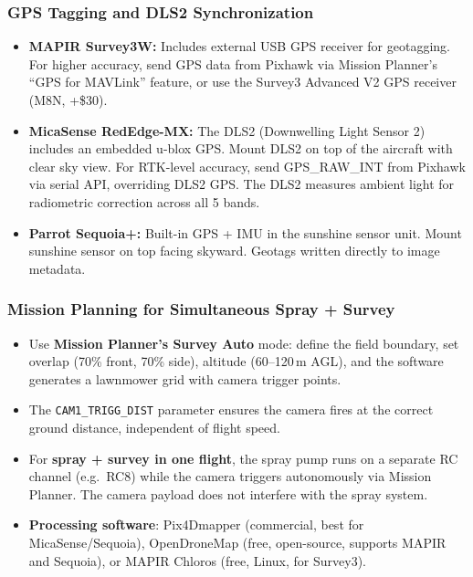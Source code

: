 \documentclass[11pt,a4paper]{article}
\begin{document}
\subsubsection{GPS Tagging and DLS2 Synchronization}

\begin{itemize}
\item \textbf{MAPIR Survey3W:} Includes external USB GPS receiver for geotagging. For higher accuracy, send GPS data from Pixhawk via Mission Planner's ``GPS for MAVLink'' feature, or use the Survey3 Advanced V2 GPS receiver (M8N, +\$30).
\item \textbf{MicaSense RedEdge-MX:} The DLS2 (Downwelling Light Sensor 2) includes an embedded u-blox GPS. Mount DLS2 on top of the aircraft with clear sky view. For RTK-level accuracy, send GPS\_RAW\_INT from Pixhawk via serial API, overriding DLS2 GPS. The DLS2 measures ambient light for radiometric correction across all 5 bands.
\item \textbf{Parrot Sequoia+:} Built-in GPS + IMU in the sunshine sensor unit. Mount sunshine sensor on top facing skyward. Geotags written directly to image metadata.
\end{itemize}

\subsubsection{Mission Planning for Simultaneous Spray + Survey}

\begin{itemize}
\item Use \textbf{Mission Planner's Survey Auto} mode: define the field boundary, set overlap (70\% front, 70\% side), altitude (60--120\,m AGL), and the software generates a lawnmower grid with camera trigger points.
\item The \texttt{CAM1\_TRIGG\_DIST} parameter ensures the camera fires at the correct ground distance, independent of flight speed.
\item For \textbf{spray + survey in one flight}, the spray pump runs on a separate RC channel (e.g.\ RC8) while the camera triggers autonomously via Mission Planner. The camera payload does not interfere with the spray system.
\item \textbf{Processing software}: Pix4Dmapper (commercial, best for MicaSense/Sequoia), OpenDroneMap (free, open-source, supports MAPIR and Sequoia), or MAPIR Chloros (free, Linux, for Survey3).
\end{itemize}
\end{document}
